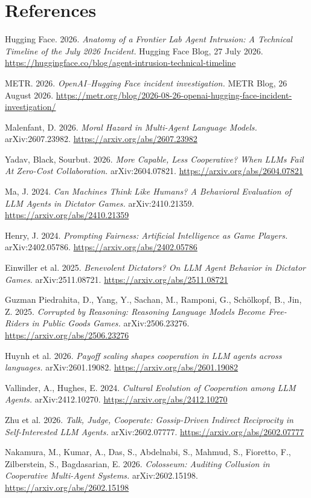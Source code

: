 \documentclass[11pt]{article}
\begin{document}
\section*{References}

{\sloppy
\begin{enumerate}[label={[\arabic*]},leftmargin=2.2em]
  \item Hugging Face. 2026. \textit{Anatomy of a Frontier Lab Agent Intrusion: A Technical Timeline
  of the July 2026 Incident.} Hugging Face Blog, 27 July 2026.
  \url{https://huggingface.co/blog/agent-intrusion-technical-timeline}
  \item METR. 2026. \textit{OpenAI--Hugging Face incident investigation.} METR Blog, 26 August 2026.
  \url{https://metr.org/blog/2026-08-26-openai-hugging-face-incident-investigation/}
  \item Malenfant, D. 2026. \textit{Moral Hazard in Multi-Agent Language Models.}
  arXiv:2607.23982. \url{https://arxiv.org/abs/2607.23982}
  \item Yadav, Black, Sourbut. 2026. \textit{More Capable, Less Cooperative? When LLMs Fail At
  Zero-Cost Collaboration.} arXiv:2604.07821. \url{https://arxiv.org/abs/2604.07821}
  \item Ma, J. 2024. \textit{Can Machines Think Like Humans? A Behavioral Evaluation of LLM Agents
  in Dictator Games.} arXiv:2410.21359. \url{https://arxiv.org/abs/2410.21359}
  \item Henry, J. 2024. \textit{Prompting Fairness: Artificial Intelligence as Game Players.}
  arXiv:2402.05786. \url{https://arxiv.org/abs/2402.05786}
  \item Einwiller et al. 2025. \textit{Benevolent Dictators? On LLM Agent Behavior in Dictator
  Games.} arXiv:2511.08721. \url{https://arxiv.org/abs/2511.08721}
  \item Guzman Piedrahita, D., Yang, Y., Sachan, M., Ramponi, G., Sch\"olkopf, B., Jin, Z. 2025.
  \textit{Corrupted by Reasoning: Reasoning Language Models Become Free-Riders in Public Goods
  Games.} arXiv:2506.23276. \url{https://arxiv.org/abs/2506.23276}
  \item Huynh et al. 2026. \textit{Payoff scaling shapes cooperation in LLM agents across
  languages.} arXiv:2601.19082. \url{https://arxiv.org/abs/2601.19082}
  \item Vallinder, A., Hughes, E. 2024. \textit{Cultural Evolution of Cooperation among LLM
  Agents.} arXiv:2412.10270. \url{https://arxiv.org/abs/2412.10270}
  \item Zhu et al. 2026. \textit{Talk, Judge, Cooperate: Gossip-Driven Indirect Reciprocity in
  Self-Interested LLM Agents.} arXiv:2602.07777. \url{https://arxiv.org/abs/2602.07777}
  \item Nakamura, M., Kumar, A., Das, S., Abdelnabi, S., Mahmud, S., Fioretto, F., Zilberstein, S.,
  Bagdasarian, E. 2026. \textit{Colosseum: Auditing Collusion in Cooperative Multi-Agent Systems.}
  arXiv:2602.15198. \url{https://arxiv.org/abs/2602.15198}
\end{enumerate}
\par}
\end{document}
